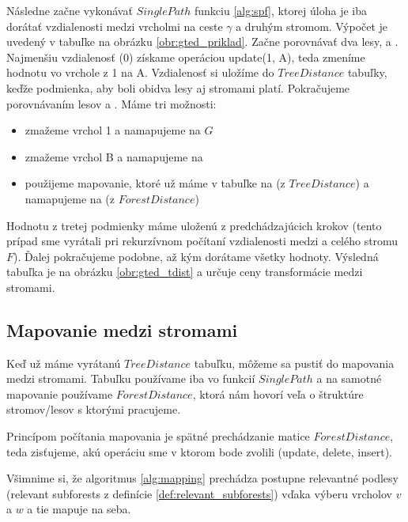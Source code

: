 

Následne začne vykonávať $SinglePath$ funkciu \ref{alg:spf}, ktorej úloha je iba dorátať
vzdialenosti medzi vrcholmi na ceste $\gamma$ a druhým stromom.
Výpočet je uvedený v tabuľke na obrázku \ref{obr:gted_priklad}.
Začne porovnávať dva lesy,  a . Najmenšiu vzdialenosť (0) získame operáciou
update(1, A), teda zmeníme hodnotu vo vrchole z 1 na A. Vzdialenosť si uložíme do $TreeDistance$
tabuľky, keďže podmienka, aby boli obidva lesy aj stromami platí.
Pokračujeme porovnávaním lesov  a .
Máme tri možnosti:
\begin{itemize}
  \item zmažeme vrchol 1 a namapujeme \set{} na $G$
  \item zmažeme vrchol B a namapujeme  na 
  \item použijeme mapovanie, ktoré už máme v tabuľke  na  (z $TreeDistance$)
    a namapujeme \set{} na  (z $ForestDistance$)
\end{itemize}
Hodnotu z tretej podmienky máme uloženú z predchádzajúcich krokov (tento prípad sme vyrátali
pri rekurzívnom počítaní vzdialenosti medzi  a celého stromu $F$).
Ďalej pokračujeme podobne, až kým dorátame všetky hodnoty.
Výsledná tabuľka je na obrázku \ref{obr:gted_tdist} a určuje ceny transformácie
medzi stromami.






\subsection{Mapovanie medzi stromami}

Keď už máme vyrátanú $TreeDistance$ tabuľku, môžeme sa pustiť do mapovania medzi
stromami. Tabuľku používame iba vo funkcií $SinglePath$ a na samotné mapovanie
používame $ForestDistance$, ktorá nám hovorí veľa o štruktúre stromov/lesov
s ktorými pracujeme.



Princípom počítania mapovania je spätné prechádzanie matice $ForestDistance$, teda
zisťujeme, akú operáciu sme v ktorom bode zvolili (update, delete, insert).

Všimnime si, že algoritmus \ref{alg:mapping} prechádza postupne
relevantné podlesy (relevant subforests z definície \ref{def:relevant_subforests})
vďaka výberu vrcholov $v$ a $w$ a tie mapuje na seba.

